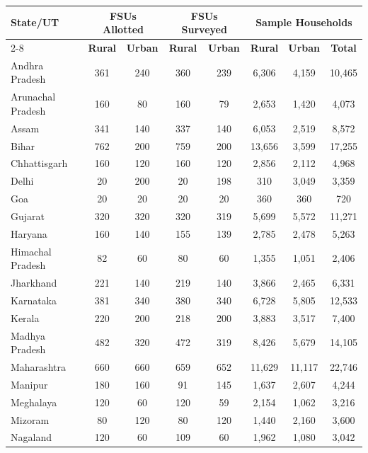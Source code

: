 \documentclass{article}
\begin{document}
		\begin{longtable}{|l|c|c|c|c|c|c|c|}
			\hline
			\textbf{State/UT} & \multicolumn{2}{c|}{\textbf{FSUs Allotted}} & \multicolumn{2}{c|}{\textbf{FSUs Surveyed}} & \multicolumn{3}{c|}{\textbf{Sample Households}} \\ \cline{2-8}
			& \textbf{Rural} & \textbf{Urban} & \textbf{Rural} & \textbf{Urban} & \textbf{Rural} & \textbf{Urban} & \textbf{Total} \\ \hline
			\endhead
			
			Andhra Pradesh & 361 & 240 & 360 & 239 & 6,306 & 4,159 & 10,465 \\ \hline
			Arunachal Pradesh & 160 & 80 & 160 & 79 & 2,653 & 1,420 & 4,073 \\ \hline
			Assam & 341 & 140 & 337 & 140 & 6,053 & 2,519 & 8,572 \\ \hline
			Bihar & 762 & 200 & 759 & 200 & 13,656 & 3,599 & 17,255 \\ \hline
			Chhattisgarh & 160 & 120 & 160 & 120 & 2,856 & 2,112 & 4,968 \\ \hline
			Delhi & 20 & 200 & 20 & 198 & 310 & 3,049 & 3,359 \\ \hline
			Goa & 20 & 20 & 20 & 20 & 360 & 360 & 720 \\ \hline
			Gujarat & 320 & 320 & 320 & 319 & 5,699 & 5,572 & 11,271 \\ \hline
			Haryana & 160 & 140 & 155 & 139 & 2,785 & 2,478 & 5,263 \\ \hline
			Himachal Pradesh & 82 & 60 & 80 & 60 & 1,355 & 1,051 & 2,406 \\ \hline
			Jharkhand & 221 & 140 & 219 & 140 & 3,866 & 2,465 & 6,331 \\ \hline
			Karnataka & 381 & 340 & 380 & 340 & 6,728 & 5,805 & 12,533 \\ \hline
			Kerala & 220 & 200 & 218 & 200 & 3,883 & 3,517 & 7,400 \\ \hline
			Madhya Pradesh & 482 & 320 & 472 & 319 & 8,426 & 5,679 & 14,105 \\ \hline
			Maharashtra & 660 & 660 & 659 & 652 & 11,629 & 11,117 & 22,746 \\ \hline
			Manipur & 180 & 160 & 91 & 145 & 1,637 & 2,607 & 4,244 \\ \hline
			Meghalaya & 120 & 60 & 120 & 59 & 2,154 & 1,062 & 3,216 \\ \hline
			Mizoram & 80 & 120 & 80 & 120 & 1,440 & 2,160 & 3,600 \\ \hline
			Nagaland & 120 & 60 & 109 & 60 & 1,962 & 1,080 & 3,042 \\ \hline

\end{longtable}
\end{document}
